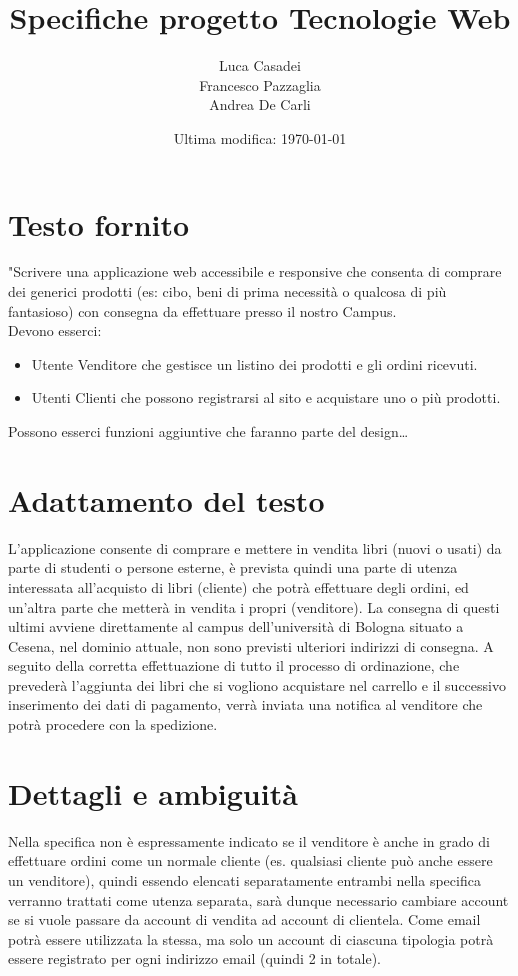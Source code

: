 \documentclass[a4paper]{article}
\author{Luca Casadei\\Francesco Pazzaglia\\Andrea De Carli}
\date{Ultima modifica: \today}
\title{\textbf{Specifiche progetto Tecnologie Web}}
\begin{document}
	\maketitle
	\tableofcontents
	\printnoidxglossaries
	\section{Testo fornito}
	"Scrivere una applicazione web accessibile e responsive che consenta di comprare dei generici prodotti (es:	cibo, beni di prima necessità o qualcosa di più fantasioso) con consegna da effettuare presso il nostro Campus.\\
	Devono esserci:
	\begin{itemize}
		\item Utente Venditore che gestisce un listino dei prodotti e gli ordini ricevuti.
		\item Utenti Clienti che possono registrarsi al sito e acquistare uno o più prodotti.
	\end{itemize}
	Possono esserci funzioni aggiuntive che faranno parte del design\dots\quotedblbase
	\section{Adattamento del testo}
	L'applicazione consente di comprare e mettere in vendita libri (nuovi o usati) da parte di studenti o persone esterne, è prevista quindi una parte di utenza interessata all'acquisto di libri (\gls{cliente}) che potrà effettuare degli ordini, ed un'altra parte che metterà in vendita i propri (\gls{venditore}). La consegna di questi ultimi avviene direttamente al \Gls{campus} dell'università di Bologna situato a Cesena, nel dominio attuale, non sono previsti ulteriori indirizzi di consegna. A seguito della corretta effettuazione di tutto il processo di ordinazione, che prevederà l'aggiunta dei libri che si vogliono acquistare nel carrello e il successivo inserimento dei dati di pagamento, verrà inviata una notifica al venditore che potrà procedere con la spedizione.
	\section{Dettagli e ambiguità}
	Nella specifica non è espressamente indicato se il venditore è anche in grado di effettuare ordini come un normale cliente (es. qualsiasi cliente può anche essere un venditore), quindi essendo elencati separatamente entrambi nella specifica verranno trattati come utenza separata, sarà dunque necessario cambiare account se si vuole passare da account di vendita ad account di clientela. Come email potrà essere utilizzata la stessa, ma solo un account di ciascuna tipologia potrà essere registrato per ogni indirizzo email (quindi 2 in totale).
\end{document}
